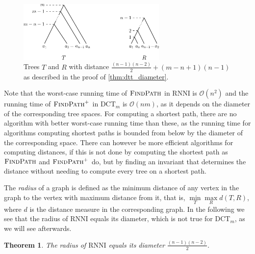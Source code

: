 \documentclass[11pt]{amsart}
\newtheorem{theorem}{Theorem}
\newcommand{\rnni}{\mathrm{RNNI}}
\newcommand{\findpath}{\textsc{FindPath}}
\newcommand{\dct}{\mathrm{DCT}}
\renewcommand{\O}{\mathcal O}
\newcommand{\summary}[1]{} %
\begin{document}
\begin{figure}[ht]
	\includegraphics[width=0.65\textwidth]{cat_max_dist_dtt.eps}
	\caption{Trees $T$ and $R$ with distance $\frac{(n-1)(n-2)}{2} + (m-n+1)(n-1)$ as described in the proof of \autoref{thm:dtt_diameter}.}
	\label{fig:cat_max_dist_dtt}
\end{figure}

Note that the worst-case running time of $\findpath$ in $\rnni$ is $\O(n^2)$ and the running time of $\findpath^+$ in $\dct_m$ is $\O(nm)$, as it depends on the diameter of the corresponding tree spaces.
For computing a shortest path, there are no algorithm with better worst-case running time than these, as the running time for algorithms computing shortest paths is bounded from below by the diameter of the corresponding space.
There can however be more efficient algorithms for computing distances, if this is not done by computing the shortest path as $\findpath$ and $\findpath^+$ do, but by finding an invariant that determines the distance without needing to compute every tree on a shortest path.
\vspace{12pt}

\summary{Radius of $\rnni$ is equal to its diameter.}
The \emph{radius} of a graph is defined as the minimum distance of any vertex in the graph to the vertex with maximum distance from it, that is, $\min\limits_{T}\max\limits_{R} d(T,R)$, where $d$ is the distance measure in the corresponding graph.
In the following we see that the radius of $\rnni$ equals its diameter, which is not true for $\dct_m$, as we will see afterwards.

\begin{theorem}
	The radius of $\rnni$ equals its diameter $\frac{(n-1)(n-2)}{2}$.
	\label{thm:radius_rnni}
\end{theorem}
\end{document}

